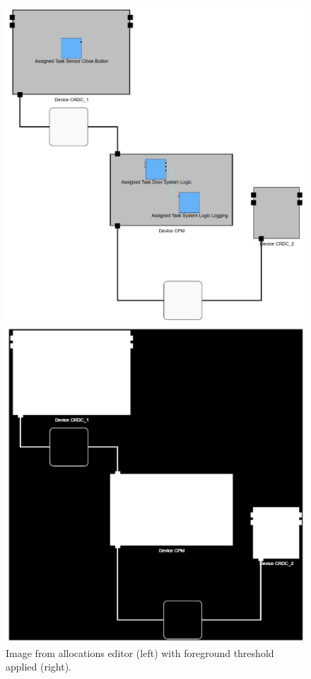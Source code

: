 \begin{figure}[htb]
    \centering
    \begin{minipage}[b]{0.36\textwidth}
        \includegraphics[width=\textwidth]{Pictures/foreground_threshold_before.png}
    \end{minipage}
    \hfill
    \begin{minipage}[b]{0.36\textwidth}
        \includegraphics[width=\textwidth]{Pictures/foreground_threshold_after.png}
    \end{minipage}
    \caption{Image from allocations editor (left) with foreground threshold applied (right).}
    \label{fig_foreground_threshold}
\end{figure}\\
